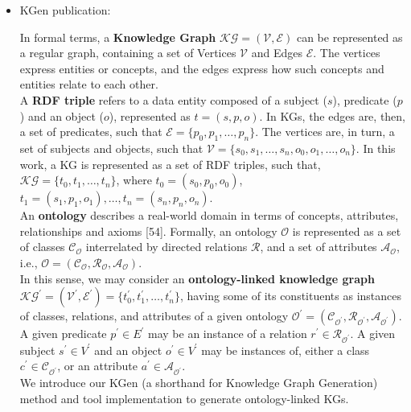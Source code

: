 \documentclass{article}
\begin{document}
\begin{itemize}

\item KGen publication:
\begin{displayquote}
In formal terms, a \textbf{Knowledge Graph} $ \mathcal{KG} = (\mathcal{V}, \mathcal{E}) $ can be represented as a regular graph, containing a set of Vertices $ \mathcal{V} $ and Edges $ \mathcal{E} $. The vertices express entities or concepts, and the edges express how such concepts and entities relate to each other.\\
A \textbf{RDF triple} refers to a data entity composed of a subject ($ s $), predicate ($ p $) and an object ($ o $), represented as $ t = (s, p, o) $. In KGs, the edges are, then, a set of predicates, such that $ \mathcal{E} = \{p_0, p_1, \ldots, p_n\} $. The vertices are, in turn, a set of subjects and objects, such that $ \mathcal{V} = \{s_0, s_1, \ldots, s_n, o_0, o_1, \ldots, o_n\} $. In this work, a KG is represented as a set of RDF triples, such that, $ \mathcal{KG} = \{t_0, t_1, \ldots, t_n\} $, where $ t_0 = (s_0, p_0, o_0) $, $ t_1 = (s_1, p_1, o_1), \ldots, t_n = (s_n, p_n, o_n) $.\\
An \textbf{ontology} describes a real-world domain in terms of concepts, attributes, relationships and axioms [54]. Formally, an ontology $ \mathcal{O} $ is represented as a set of classes $ \mathcal{C_O} $ interrelated by directed relations $ \mathcal{R} $, and a set of attributes $ \mathcal{A_O} $, i.e., $ \mathcal{O} = ( \mathcal{C_O}, \mathcal{R_O}, \mathcal{A_O} ) $.\\
In this sense, we may consider an \textbf{ontology-linked knowledge graph} $ \mathcal{KG^\prime} = (\mathcal{V^\prime}, \mathcal{E^\prime}) = \{t^\prime_0, t^\prime_1, \ldots, t^\prime_n\} $, having some of its constituents as instances of classes, relations, and attributes of a given ontology $ \mathcal{O^\prime} = (\mathcal{C_{O^\prime}} , \mathcal{R_{O^\prime}} , \mathcal{A_{O^\prime}} ) $. A given predicate $ p^\prime \in E^\prime $ may be an instance of a relation $ r^\prime \in \mathcal{R_{O^\prime}} $. A given subject $ s^\prime \in V^\prime $ and an object $ o^\prime \in V^\prime $ may be instances of, either a class $ c^\prime \in \mathcal{C_{O^\prime}} $, or an attribute $ a^\prime \in \mathcal{A_{O^\prime}} $.\\
We introduce our KGen (a shorthand for Knowledge Graph Generation) method and tool implementation to generate ontology-linked KGs.
\end{displayquote}



\end{itemize}
\end{document}
